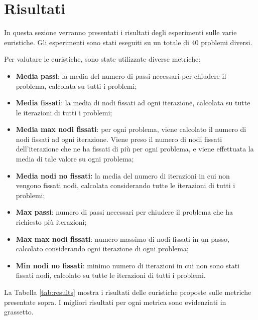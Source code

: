 \section{Risultati}
\label{sec:risultati}

In questa sezione verranno presentati i risultati degli esperimenti sulle varie euristiche. Gli esperimenti sono stati eseguiti su un totale di 40 problemi diversi. 

Per valutare le euristiche, sono state utilizzate diverse metriche:

\begin{itemize}
\item \textbf{Media passi}: la media del numero di passi necessari per chiudere il problema, calcolata su tutti i problemi;
\item \textbf{Media fissati}: la media di nodi fissati ad ogni iterazione, calcolata su tutte le iterazioni di tutti i problemi;
\item \textbf{Media max nodi fissati}: per ogni problema, viene calcolato il numero di nodi fissati ad ogni iterazione. Viene preso il numero di nodi fissati dell'iterazione che ne ha fissati di più per ogni problema, e viene effettuata la media di tale valore su ogni problema;
\item \textbf{Media nodi no fissati:} la media del numero di iterazioni in cui non vengono fissati nodi, calcolata considerando tutte le iterazioni di tutti i problemi;
\item \textbf{Max passi}: numero di passi necessari per chiudere il problema che ha richiesto più iterazioni;
\item \textbf{Max max nodi fissati}: numero massimo di nodi fissati in un passo, calcolato considerando ogni iterazione di ogni problema;
\item \textbf{Min nodi no fissati}: minimo numero di iterazioni in cui non sono stati fissati nodi, calcolato su tutte le iterazioni di tutti i problemi.
\end{itemize}

La Tabella \ref{tab:results} mostra i risultati delle euristiche proposte sulle metriche presentate sopra. I migliori risultati per ogni metrica sono evidenziati in grassetto. 

